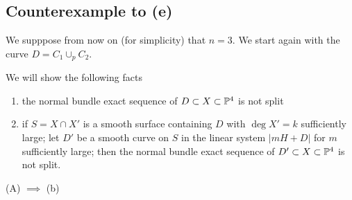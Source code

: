\documentclass[12pt]{article}
\begin{document}
\subsection{Counterexample to (e)}

We supppose from now on (for simplicity) that $n = 3$. We start again with the curve $D = C_1 \cup_p C_2$.
\par 
We will show the following facts 
\begin{enumerate}
\item[(A)] the normal bundle exact sequence of $D \subset X \subset \P^4$ is not split
\item[(B)] if $S = X \cap X'$ is a smooth surface containing $D$ with $\deg{X'} = k$ sufficiently large; let $D'$ be a smooth curve on $S$ in the linear system $| m H + D |$ for $m$ sufficiently large; then the normal bundle exact sequence of $D' \subset X \subset \P^4$ is not split.
\end{enumerate}
\begin{lemma}
(A) $\implies$ (b)
\end{lemma}
\end{document}
